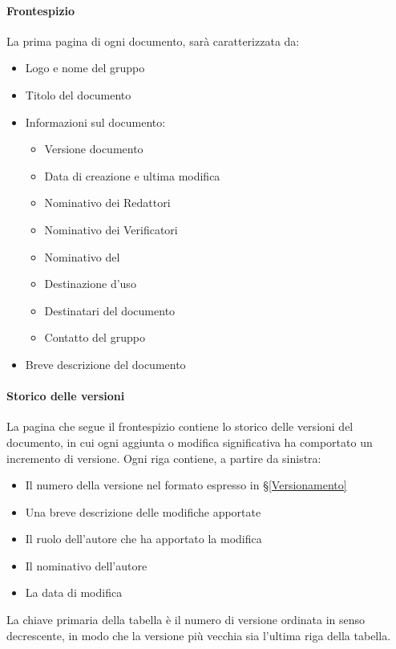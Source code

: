 			\paragraph{Frontespizio}\label{PS:Documentazione:Struttura:Frontespizio}
			La prima pagina di ogni documento, sarà caratterizzata da:
			\begin{itemize}
				\item Logo e nome del gruppo
				\item Titolo del documento
				\item Informazioni sul documento:
					\begin{itemize}
						\item Versione documento
						\item Data di creazione e ultima modifica
						\item Nominativo dei Redattori
						\item Nominativo dei Verificatori
						\item Nominativo del \Res
						\item Destinazione d'uso
						\item Destinatari del documento
						\item Contatto del gruppo
					\end{itemize}
				\item Breve descrizione del documento
			\end{itemize}

			\paragraph{Storico delle versioni}\label{PS:Documentazione:Struttura:StoricoVersioni}
			La pagina che segue il frontespizio contiene lo storico delle versioni del documento, in cui ogni aggiunta o modifica significativa ha
			comportato un incremento di versione. Ogni riga contiene, a partire da sinistra:
			\begin{itemize}
				\item Il numero della versione nel formato espresso in \S\ref{Versionamento}
				\item Una breve descrizione delle modifiche apportate
				\item Il ruolo dell'autore che ha apportato la modifica
				\item Il nominativo dell'autore
				\item La data di modifica
			\end{itemize}
			La chiave primaria della tabella è il numero di versione ordinata in senso decrescente, in modo che la versione più vecchia sia
			l'ultima riga della tabella.

